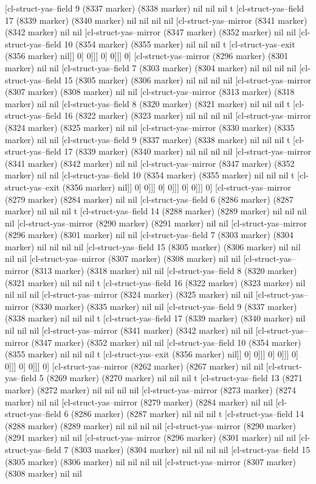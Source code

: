 {{[cl-struct-yas--field 9 (8337 marker) (8338 marker) nil nil nil t [cl-struct-yas--field 17 (8339 marker) (8340 marker) nil nil nil nil [cl-struct-yas--mirror (8341 marker) (8342 marker) nil nil [cl-struct-yas--mirror (8347 marker) (8352 marker) nil nil [cl-struct-yas--field 10 (8354 marker) (8355 marker) nil nil nil t [cl-struct-yas--exit (8356 marker) nil]] 0] 0]]] 0] 0]]] 0] [cl-struct-yas--mirror (8296 marker) (8301 marker) nil nil [cl-struct-yas--field 7 (8303 marker) (8304 marker) nil nil nil nil [cl-struct-yas--field 15 (8305 marker) (8306 marker) nil nil nil nil [cl-struct-yas--mirror (8307 marker) (8308 marker) nil nil [cl-struct-yas--mirror (8313 marker) (8318 marker) nil nil [cl-struct-yas--field 8 (8320 marker) (8321 marker) nil nil nil t [cl-struct-yas--field 16 (8322 marker) (8323 marker) nil nil nil nil [cl-struct-yas--mirror (8324 marker) (8325 marker) nil nil [cl-struct-yas--mirror (8330 marker) (8335 marker) nil nil [cl-struct-yas--field 9 (8337 marker) (8338 marker) nil nil nil t [cl-struct-yas--field 17 (8339 marker) (8340 marker) nil nil nil nil [cl-struct-yas--mirror (8341 marker) (8342 marker) nil nil [cl-struct-yas--mirror (8347 marker) (8352 marker) nil nil [cl-struct-yas--field 10 (8354 marker) (8355 marker) nil nil nil t [cl-struct-yas--exit (8356 marker) nil]] 0] 0]]] 0] 0]]] 0] 0]]] 0] [cl-struct-yas--mirror (8279 marker) (8284 marker) nil nil [cl-struct-yas--field 6 (8286 marker) (8287 marker) nil nil nil t [cl-struct-yas--field 14 (8288 marker) (8289 marker) nil nil nil nil [cl-struct-yas--mirror (8290 marker) (8291 marker) nil nil [cl-struct-yas--mirror (8296 marker) (8301 marker) nil nil [cl-struct-yas--field 7 (8303 marker) (8304 marker) nil nil nil nil [cl-struct-yas--field 15 (8305 marker) (8306 marker) nil nil nil nil [cl-struct-yas--mirror (8307 marker) (8308 marker) nil nil [cl-struct-yas--mirror (8313 marker) (8318 marker) nil nil [cl-struct-yas--field 8 (8320 marker) (8321 marker) nil nil nil t [cl-struct-yas--field 16 (8322 marker) (8323 marker) nil nil nil nil [cl-struct-yas--mirror (8324 marker) (8325 marker) nil nil [cl-struct-yas--mirror (8330 marker) (8335 marker) nil nil [cl-struct-yas--field 9 (8337 marker) (8338 marker) nil nil nil t [cl-struct-yas--field 17 (8339 marker) (8340 marker) nil nil nil nil [cl-struct-yas--mirror (8341 marker) (8342 marker) nil nil [cl-struct-yas--mirror (8347 marker) (8352 marker) nil nil [cl-struct-yas--field 10 (8354 marker) (8355 marker) nil nil nil t [cl-struct-yas--exit (8356 marker) nil]] 0] 0]]] 0] 0]]] 0] 0]]] 0] 0]]] 0] [cl-struct-yas--mirror (8262 marker) (8267 marker) nil nil [cl-struct-yas--field 5 (8269 marker) (8270 marker) nil nil nil t [cl-struct-yas--field 13 (8271 marker) (8272 marker) nil nil nil nil [cl-struct-yas--mirror (8273 marker) (8274 marker) nil nil [cl-struct-yas--mirror (8279 marker) (8284 marker) nil nil [cl-struct-yas--field 6 (8286 marker) (8287 marker) nil nil nil t [cl-struct-yas--field 14 (8288 marker) (8289 marker) nil nil nil nil [cl-struct-yas--mirror (8290 marker) (8291 marker) nil nil [cl-struct-yas--mirror (8296 marker) (8301 marker) nil nil [cl-struct-yas--field 7 (8303 marker) (8304 marker) nil nil nil nil [cl-struct-yas--field 15 (8305 marker) (8306 marker) nil nil nil nil [cl-struct-yas--mirror (8307 marker) (8308 marker) nil nil }}
